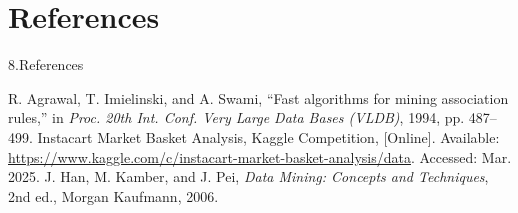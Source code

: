 \documentclass{beamer}
\begin{document}
\section{References}

\begin{frame}{8.References}
    \begin{thebibliography}{9}
         R. Agrawal, T. Imielinski, and A. Swami, ``Fast algorithms for mining association rules,'' in \textit{Proc. 20th Int. Conf. Very Large Data Bases (VLDB)}, 1994, pp. 487--499.
         Instacart Market Basket Analysis, Kaggle Competition, [Online]. Available: \url{https://www.kaggle.com/c/instacart-market-basket-analysis/data}. Accessed: Mar. 2025.
         J. Han, M. Kamber, and J. Pei, \textit{Data Mining: Concepts and Techniques}, 2nd ed., Morgan Kaufmann, 2006.
    \end{thebibliography}
\end{frame}
\end{document}
